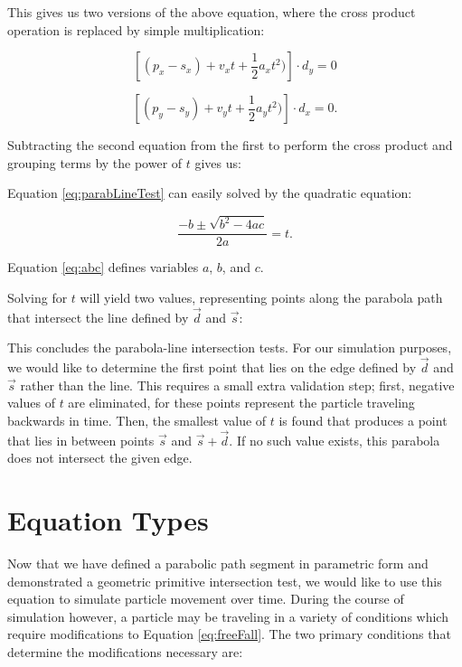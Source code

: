 This gives us two versions of the above equation, where the cross product operation is replaced by simple multiplication:

$$
\left [ (p_x - s_x) + v_x  t + \frac{1}{2} a_x  t^2) \right ] \cdot  d_y = 0
$$

\vspace{0.1in}

$$
\left [ (p_y - s_y) + v_y t + \frac{1}{2} a_y t^2) \right ] \cdot d_x = 0.
$$

Subtracting the second equation from the first to perform the cross product and grouping terms by the power of $t$ gives us:


 {
	\label{eq:parabLineTest}
}

Equation \eqref{eq:parabLineTest} can easily solved by the quadratic equation:

$$
	\frac{-b \pm \sqrt{b^2 - 4ac}}{2a} = t.
$$

Equation \eqref{eq:abc} defines variables $a$, $b$, and $c$.


Solving for $t$ will yield two values, representing points along the parabola path that intersect the line defined by $\vec{d}$ and $\vec{s}$:


This concludes the parabola-line intersection tests. For our simulation purposes, we would like to determine the first point that lies on the edge defined by $\vec{d}$ and $\vec{s}$ rather than the line. This requires a small extra validation step; first, negative values of $t$ are eliminated, for these points represent the particle traveling backwards in time. Then, the smallest value of $t$ is found that produces a point that lies in between points $\vec{s}$ and $\vec{s} + \vec{d}$. If no such value exists, this parabola does not intersect the given edge.

\section{Equation Types}

Now that we have defined a parabolic path segment in parametric form and demonstrated a geometric primitive intersection test, we would like to use this equation to simulate particle movement over time. During the course of simulation however, a particle may be traveling in a variety of conditions which require modifications to Equation \eqref{eq:freeFall}. The two primary conditions that determine the modifications necessary are:

